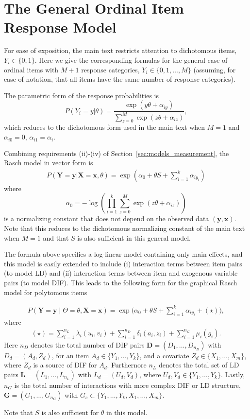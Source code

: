 \section*{The General Ordinal Item Response Model}

For ease of exposition, the main text restricts attention to dichotomous items, $Y_i\in\{0,1\}$. Here we give the corresponding formulas for the general case of ordinal items with $M+1$ response categories, $Y_i\in\{0,1,\ldots,M\}$ (assuming, for ease of notation, that all items have the same number of response categories).

The parametric form of the response probabilities is
$$
P(Y_i=y|\theta)=\frac{\exp(y\theta+\alpha_{iy})}{\sum_{z=0}^M\exp(z\theta+\alpha_{iz})},
$$
which reduces to the dichotomous form used in the main text when $M=1$ and $\alpha_{i0}=0$, $\alpha_{i1}=\alpha_i$.

Combining requirements (ii)-(iv) of Section~\ref{sec:models_measurement}, the Rasch model in vector form is
\begin{align}
P(\boldsymbol{Y} = \boldsymbol{y} | \boldsymbol{X} = \boldsymbol{x}, \theta) =\exp\left(\alpha_0+\theta S+\sum_{i=1}^k\alpha_{iy_i}\right)
\end{align}
where
$$
\alpha_0=-\log\left(\prod_{i=1}^k\sum_{z=0}^M\exp(z\theta+\alpha_{iz})\right)
$$
is a normalizing constant that does not depend on the observed data $(\boldsymbol{y},\boldsymbol{x})$. Note that this reduces to the dichotomous normalizing constant of the main text when $M=1$ and that $S$ is also sufficient in this general model.


The formula above specifies a log-linear model containing only main effects, and this model is easily extended to include (i) interaction terms between item pairs (to model LD) and (ii) interaction terms between item and exogenous variable pairs (to model DIF). This leads to the following form for the graphical Rasch model for polytomous items 

\begin{align}
P(\mathbf{Y}=\mathbf{y}\mid \Theta=\theta,\mathbf{X}=\mathbf{x}) = \exp\Big(\alpha_0+\theta S+\sum_{i=1}^k\alpha_{iy_i}+(\star)\Big),
\end{align}
where
\begin{align}
(\star)=\sum_{i=1}^{n_L}\lambda_i(u_i,v_i)+ \sum_{i=1}^{n_D}\delta_i(a_i,z_i)+\sum_{i=1}^{n_G}\mu_i(g_i).
\end{align}
Here $n_D$ denotes the total number of DIF pairs $\boldsymbol{D}=(D_1,\dots,D_{n_D})$ with $D_d=(A_d,Z_d)$, for an item $A_d\in\{Y_1,\dots,Y_k\}$, and a covariate $Z_d\in\{X_1,\dots,X_m\}$, where $Z_d$ is a source of DIF for $A_d$. Furthernore $n_L$ denotes the total set of LD pairs $\boldsymbol{L}=(L_1,\dots,L_{n_L})$ with $L_d=(U_d,V_d)$, where $U_d,V_d\in\{Y_1,\dots,Y_k\}$. Lastly, $n_G$ is the total number of interactions with more complex DIF or LD structure, $\boldsymbol{G}=(G_1,\dots,G_{n_G})$ with $G_c\subset \{Y_1,\dots,Y_k,X_1,\dots,X_m\}$.

Note that $S$ is also sufficient for $\theta$ in this model.